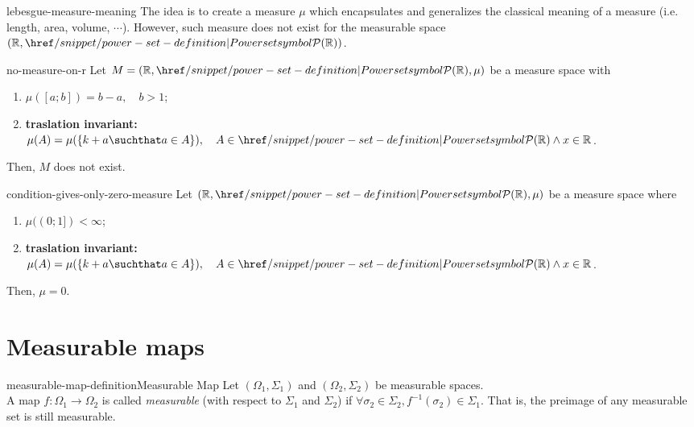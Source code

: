 \documentclass[preview]{standalone}
\begin{document}
\genpage

\begin{snippet}{lebesgue-measure-meaning}
    The idea is to create a measure \(\mu\) which encapsulates
    and generalizes the classical meaning of a measure (i.e. length, area, volume, \(\cdots\)).
    However, such measure does not exist for the measurable space \((\mathbb{R}, \powerset(\mathbb{R}))\).
\end{snippet}

\begin{snippettheorem}{no-measure-on-r}{}
    Let \(M=(\mathbb{R}, \powerset(\mathbb{R}), \mu)\)
    be a measure space with
    \begin{enumerate}
        \item \(\mu([a;b]) = b-a, \quad b>1\);
        \item \textbf{traslation invariant:} \(\mu(A) = \mu(\{k + a \suchthat a \in A\}), \quad A \in \powerset(\mathbb{R}) \land x \in \mathbb{R}\).
    \end{enumerate}
    Then, \(M\) does not exist.
\end{snippettheorem}

\begin{snippetproposition}{condition-gives-only-zero-measure}{}
    Let \((\mathbb{R}, \powerset(\mathbb{R}), \mu)\) be a measure space where
    \begin{enumerate}
        \item \(\mu((0; 1]) < \infty\);
        \item \textbf{traslation invariant:} \(\mu(A) = \mu(\{k + a \suchthat a \in A\}), \quad A \in \powerset(\mathbb{R}) \land x \in \mathbb{R}\).
    \end{enumerate}
    Then, \(\mu = 0\).
\end{snippetproposition}


\section{Measurable maps}

\begin{snippetdefinition}{measurable-map-definition}{Measurable Map}
    Let \((\Omega_1, \Sigma_1)\) and \((\Omega_2, \Sigma_2)\) be measurable spaces. \\
    A map \(f \colon \Omega_1 \to \Omega_2\) is called \textit{measurable} (with respect to \(\Sigma_1\) and \(\Sigma_2\))
    if \(\forall \sigma_2 \in \Sigma_2, f^{-1}(\sigma_2) \in \Sigma_1\).
    That is, the preimage of any measurable set is still measurable.
\end{snippetdefinition}
\end{document}
